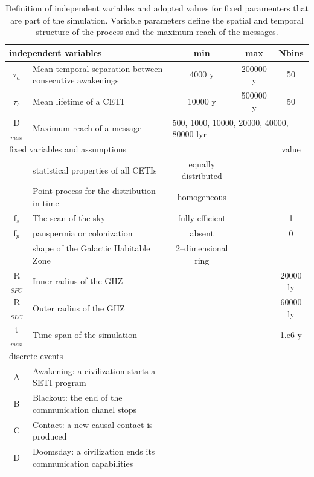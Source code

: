 \documentclass[crop]{CSLB}%
\begin{document}
 
\setlength{\tabcolsep}{10pt}
\begin{table}
\centering
\begin{tabular}{clccc}
\hline
   \multicolumn{2}{l}{independent variables} &min&max&Nbins\\
\hline
   $\tau_{a}$ & Mean temporal separation between consecutive awakenings & 4000 y & 200000 y & 50\\ 
   $\tau_{s}$ & Mean lifetime of a CETI                                 & 10000 y & 500000 y& 50\\ 
   D$_{max}$ & Maximum reach of a message  &  \multicolumn{3}{l}{500, 1000, 10000, 20000, 40000, 80000 lyr}  \\
\hline
   \multicolumn{4}{l}{fixed variables and assumptions} &value \\
\hline
   & statistical properties of all CETIs &equally distributed&&\\
   & Point process for the distribution in time & homogeneous &&\\
   f$_s$ & The scan of the sky & fully efficient&&1\\
   f$_p$ & panspermia or colonization &absent&&0\\
   & shape of the Galactic Habitable Zone & 2--dimensional ring &&\\
   R$_{SFC}$   & Inner radius of the GHZ     &&&20000 ly\\
   R$_{SLC}$   & Outer radius of the GHZ     &&&60000 ly\\
   t$_{max}$ & Time span of the simulation  &&&1.e6 y\\
\hline
   \multicolumn{5}{l}{discrete events}\\
\hline
   A & Awakening: a civilization starts a SETI program  &&&\\
   B & Blackout: the end of the communication chanel stops &&&\\
   C & Contact: a new causal contact is produced &&&\\
   D & Doomsday: a civilization ends its communication capabilities&&&\\
\hline

\hline
\end{tabular}
\caption{Definition of independent variables and adopted values for 
   fixed paramenters 
   that are part of the simulation.  Variable parameters define the
   spatial and temporal structure
   of the process and the maximum reach of the messages.}
\label{T_simu_hypotheses}
\end{table}
\end{document}
